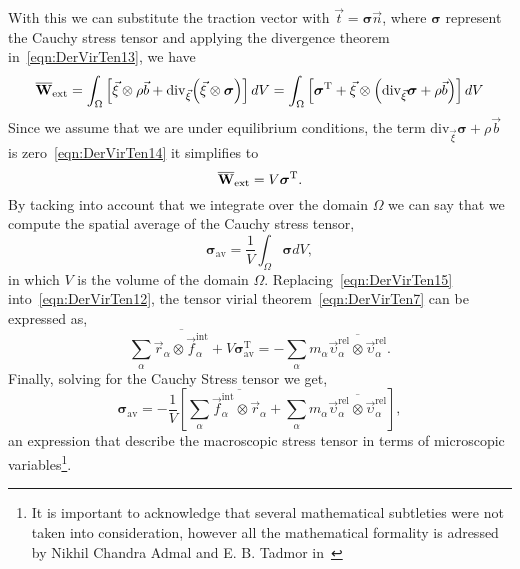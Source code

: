 \documentclass[../../main-notes.tex]{subfiles}
\begin{document}
With this we can substitute the traction vector with $\vec{t}=\bm{\sigma}\vec{n}$, where $\bm{\sigma}$ represent the Cauchy stress tensor and applying the divergence theorem in~\eqref{eqn:DerVirTen13}, we have 
\begin{equation}
    \overline{\bold{W}}_{\mathrm{ext}}
     =\int_{\Omega}
        \left[
            \vec{\xi}\otimes\rho\vec{b}+\mathrm{div}_{\vec{\xi}}\qty(\vec{\xi}\otimes\bm{\sigma})
        \right]dV
        =
    \int_{\Omega}
        \left[
            \bm{\sigma}^{\mathrm{T}}
            +
            \vec{\xi}\otimes\qty(\mathrm{div}_{\vec{\xi}}\bm{\sigma}+\rho\vec{b})
        \right]dV\label{eqn:DerVirTen14}
\end{equation}
Since we assume that we are under equilibrium conditions, the term $\mathrm{div}_{\vec{\xi}}\bm{\sigma}+\rho\vec{b}$ is zero~\eqref{eqn:DerVirTen14} it simplifies to
\begin{equation}
    \overline{\bold{W}}_{\mathrm{ext}}
    =V\bm{\sigma}^{\mathrm{T}}\label{eqn:DerVirTen15}.
\end{equation}
By tacking into account that we integrate over the domain $\Omega$ we can say that we compute the spatial average of the Cauchy stress tensor,
\begin{equation}
    \bm{\sigma}_{\mathrm{av}} =\frac{1}{V}\int_\Omega\bm{\sigma}dV\label{eqn:DerVirTen16},
\end{equation}
in which $V$ is the volume of the domain $\Omega$.
Replacing~\eqref{eqn:DerVirTen15} into~\eqref{eqn:DerVirTen12}, the tensor virial theorem~\eqref{eqn:DerVirTen7} can be expressed as,
\begin{equation}
    \sum_\alpha\overline{\vec{r}_\alpha\otimes\vec{f}_\alpha^{\mathrm{int}}}
    +
    V\bm{\sigma}_{\mathrm{av}}^{\mathrm{T}}
    =
    -\sum_\alpha m_\alpha\overline{\vec{\upsilon}_\alpha^{\mathrm{rel}}\otimes\vec{\upsilon}_\alpha^{\mathrm{rel}}}.\label{eqn:DerVirTen17}
\end{equation}
Finally, solving for the Cauchy Stress tensor we get,
\begin{equation}
    \bm{\sigma}_{\mathrm{av}}
    =
    -\frac{1}{V}
    \left[
        \sum_\alpha\overline{\vec{f}_\alpha^{\mathrm{int}}\otimes\vec{r}_\alpha}
        +
        \sum_\alpha m_\alpha\overline{\vec{\upsilon}_\alpha^{\mathrm{rel}}\otimes\vec{\upsilon}_\alpha^{\mathrm{rel}}}
    \right],\label{eqn:DerVirTen18}
\end{equation}
an expression that describe the macroscopic stress tensor in terms of microscopic variables\footnote{It is important to acknowledge that several mathematical subtleties were not taken into consideration, however all the mathematical formality is adressed by Nikhil Chandra Admal and E. B. Tadmor in~\citep{admalUnifiedInterpretationStress2010}}.
\end{document}
